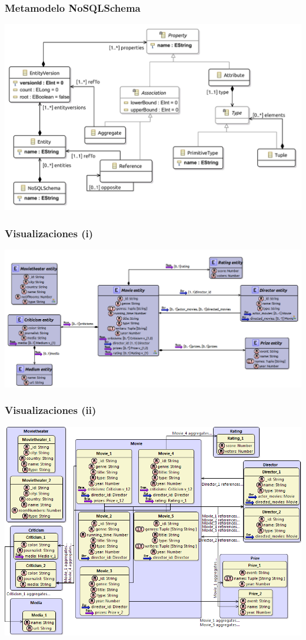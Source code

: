 \documentclass[14pt]{beamer}
\begin{document}
\begin{frame}
\begin{itemize}
\begin{frame}
  \frametitle{Metamodelo NoSQLSchema}
  \includegraphics[width=\textwidth]{img/mmnosql-schema}
\end{frame}

\begin{frame}
  \frametitle{Visualizaciones (i)}
  \includegraphics[width=\textwidth]{img/siriusglobalunion}
\end{frame}

\begin{frame}
  \frametitle{Visualizaciones (ii)}
  \includegraphics[width=\textwidth]{img/siriusglobal}
\end{frame}


\end{itemize}
\end{frame}
\end{document}
